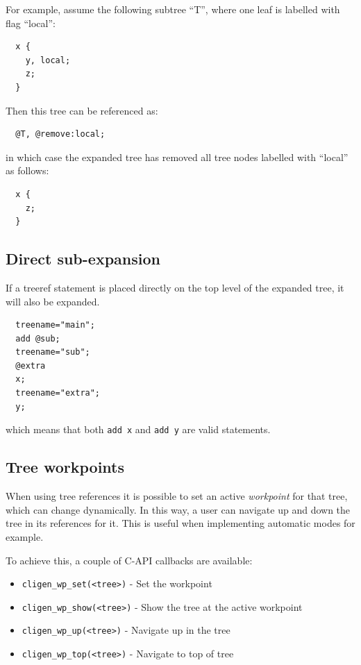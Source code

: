 \documentclass[a4paper, 10pt] {article}
\begin{document}
For example, assume the following subtree ``T'', where one leaf is labelled with flag ``local'':
\begin{verbatim}
  x {
    y, local;
    z;
  }
\end{verbatim}

Then this tree can be referenced as:
\begin{verbatim}
  @T, @remove:local;
\end{verbatim}
in which case the expanded tree has removed all tree nodes labelled with ``local'' as follows:

\begin{verbatim}
  x {
    z;
  }
\end{verbatim}

\subsection{Direct sub-expansion}

If a treeref statement is placed directly on the top level of the
expanded tree, it will also be expanded.
\begin{verbatim}
  treename="main";
  add @sub;
  treename="sub";
  @extra
  x;
  treename="extra";
  y;
\end{verbatim}

which means that both {\tt add x} and {\tt add y} are valid statements.

\subsection{Tree workpoints}

When using tree references it is possible to set an active {\em workpoint}
for that tree, which can change dynamically. In this way,
a user can navigate up and down the tree in its references for it. This
is useful when implementing automatic modes for example.

To achieve this, a couple of C-API callbacks are available:
\begin{itemize}
  \item {\tt cligen\_wp\_set(<tree>)} - Set the workpoint
  \item {\tt cligen\_wp\_show(<tree>)} - Show the tree at the active workpoint
  \item {\tt cligen\_wp\_up(<tree>)} - Navigate up in the tree
  \item {\tt cligen\_wp\_top(<tree>)} - Navigate to top of tree
\end{itemize}
\end{document}
